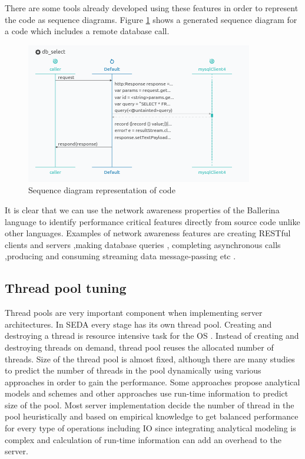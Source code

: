 There are some tools already developed \cite{ballerina_plugin_vs_code,ballerina_plugin_intelij} using these features in order to represent the code as sequence diagrams. Figure \ref{diagram_view_ballerina_code} shows a generated sequence diagram for a code which includes a remote database call.

 \begin{figure}[htbp]
	\begin{center}
		\includegraphics[scale=0.7]{figures/diagram_view_db_call.png}
	\end{center}
	\caption{Sequence diagram representation of code}
	\label{diagram_view_ballerina_code}
\end{figure}
 
It is clear that we can use the network awareness properties of the Ballerina language to identify
performance critical features directly from source code unlike other languages. Examples of network
awareness features are creating RESTful clients and servers ,making database queries , completing
asynchronous calls ,producing and consuming streaming data message-passing etc \cite{ballerina_book}.


\subsection{Thread pool tuning}

Thread pools are very important component when implementing server architectures. In SEDA every stage has its own thread pool. Creating and destroying a thread is resource intensive task for the OS \cite{thread_pool_analysis}. Instead of creating and destroying threads on demand, thread pool reuses the allocated number of threads. Size of the thread pool is almost fixed, although there are many studies to predict the number of threads in the pool dynamically using various approaches in order to gain the performance. Some approaches propose analytical models and schemes \cite{xu2004performance,thread_pool_analysis,math_aproach_thread_pool_tuning,syer2011identifying,linfeng2017design} and other approaches use run-time information \cite{lorenzon2016investigating,nieplocha2007evaluating,agrawal2006adaptive} to predict size of the pool. Most server implementation decide the number of thread in the pool heuristically and based on empirical knowledge \cite{thread_pool_analysis,math_aproach_thread_pool_tuning} to get balanced performance for every type of operations including IO since integrating analytical modeling is complex and calculation of run-time information can add an overhead to the server.

